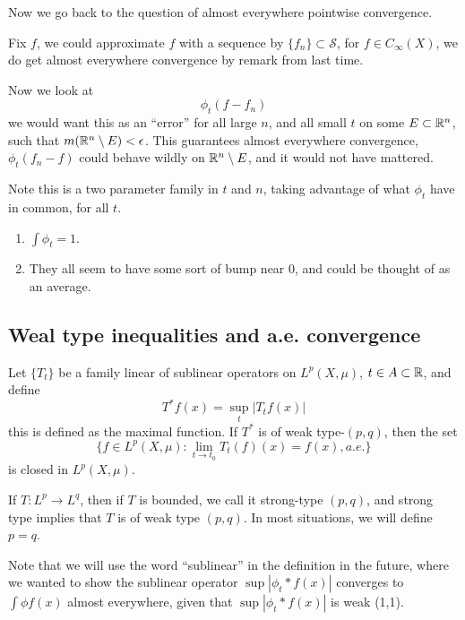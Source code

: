 Now we go back to the question of almost everywhere pointwise convergence.

Fix $f$, we could approximate $f$ with a sequence by $\{f_n\}\subset\mathcal{S}$, for $f\in C_\infty(X)$, we do get almost everywhere convergence by remark from last time.

Now we look at
\begin{equation*}
    \phi_t(f-f_n)
\end{equation*}
we would want this as an ``error'' for all large $n$, and all small $t$ on some $E\subset\mathbb{R}^n$, such that $m(\mathbb{R}^n\setminus E)<\epsilon$. This guarantees almost everywhere convergence, $\phi_t(f_n-f)$ could behave wildly on $\mathbb{R}^n\setminus E$, and it would not have mattered.

Note this is a two parameter family in $t$ and $n$, taking advantage of what $\phi_t$ have in common, for all $t$.

\begin{enumerate}
    \item $\int \phi_t=1$.
    \item They all seem to have some sort of bump near 0, and could be thought of as an average.
\end{enumerate}

\subsection{Weal type inequalities and a.e. convergence}


\begin{theorem}
    Let $\{T_t\}$ be a family linear of sublinear operators on $L^p(X,\mu)$, $t\in A\subset\mathbb{R}$, and define
    \begin{equation*}
        T^*f(x)=\sup_t|T_tf(x)|
    \end{equation*}
    this is defined as the maximal function. If $T^*$ is of weak type-$(p,q)$, then the set
    \begin{equation*}
        \{f\in L^p(X,\mu): \lim_{t\to t_0}T_t(f)(x)=f(x), a.e. \}
    \end{equation*}
    is closed in $L^p(X,\mu)$.
\end{theorem}
\begin{remark}
    If $T: L^p\to L^q$, then if $T$ is bounded, we call it strong-type $(p,q)$, and strong type implies that $T$ is of weak type $(p,q)$. In most situations, we will define $p=q$.
\end{remark}
\begin{note}
    Note that we will use the word ``sublinear'' in the definition in the future, where we wanted to show the sublinear operator $\sup|\phi_t\ast f(x)|$ converges to $\int\phi f(x)$ almost everywhere, given that $\sup|\phi_t\ast f(x)|$ is weak (1,1).
\end{note}


